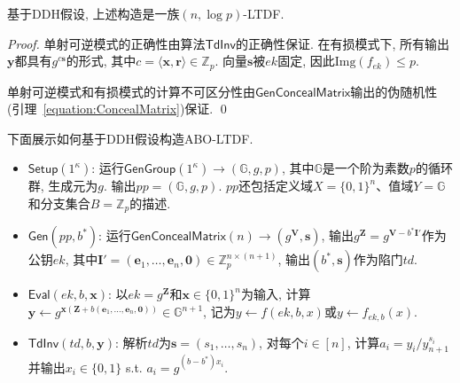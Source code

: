\begin{theorem}
基于DDH假设, 上述构造是一族$(n, \log p)$-LTDF. 
\end{theorem}

\begin{proof}
单射可逆模式的正确性由算法$\mathsf{TdInv}$的正确性保证. 
在有损模式下, 所有输出$\mathbf{y}$都具有$g^{c\mathbf{s}}$的形式, 
其中$c = \langle \mathbf{x}, \mathbf{r} \rangle \in \mathbb{Z}_p$. 
向量$\mathbf{s}$被$ek$固定, 因此$\text{Img}(f_{ek}) \leq p$. 

单射可逆模式和有损模式的计算不可区分性由$\mathsf{GenConcealMatrix}$输出的伪随机性(引理~\ref{equation:ConcealMatrix})保证. \qed
\end{proof}


下面展示如何基于DDH假设构造ABO-LTDF. 
\begin{construction}
\begin{itemize}
\item $\mathsf{Setup}(1^\kappa)$: 运行$\mathsf{GenGroup}(1^\kappa) \rightarrow (\mathbb{G}, g, p)$, 
	其中$\mathbb{G}$是一个阶为素数$p$的循环群, 生成元为$g$. 输出$pp = (\mathbb{G}, g, p)$. 
	$pp$还包括定义域$X = \{0,1\}^n$、值域$Y = \mathbb{G}$和分支集合$B = \mathbb{Z}_p$的描述. 

\item $\mathsf{Gen}(pp, b^*)$: 运行$\mathsf{GenConcealMatrix}(n) \rightarrow (g^{\mathbf{V}}, \mathbf{s})$, 
	输出$g^{\mathbf{Z}} = g^{\mathbf{V} - b^*\mathbf{I}'}$作为公钥$ek$, 
	其中$\mathbf{I}' = (\mathbf{e}_1, \dots, \mathbf{e}_n, \mathbf{0}) \in \mathbb{Z}_p^{n \times (n+1)}$, 
	输出$(b^*, \mathbf{s})$作为陷门$td$. 

\item $\mathsf{Eval}(ek, b, \mathbf{x})$: 以$ek = g^\mathbf{Z}$和$\mathbf{x} \in \{0,1\}^n$为输入, 
    计算$\mathbf{y} \leftarrow g^{\mathbf{x}(\mathbf{Z}+b(\mathbf{e}_1, \dots, \mathbf{e}_n, \mathbf{0}))} 
    \in \mathbb{G}^{n+1}$, 记为$y \leftarrow f(ek, b, x)$或$y \leftarrow f_{ek, b}(x)$. 

\item $\mathsf{TdInv}(td, b, \mathbf{y})$: 解析$td$为$\mathbf{s} = (s_1, \dots, s_n)$, 对每个$i \in [n]$, 
    计算$a_i = y_i/y_{n+1}^{s_i}$并输出$x_i \in \{0,1\}$ s.t. $a_i = g^{(b-b^*)x_i}$. 
\end{itemize}
\end{construction}

